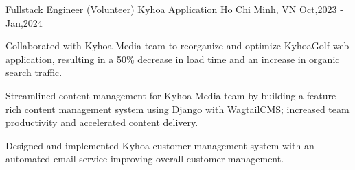 \cventry
{Fullstack Engineer (Volunteer)} %
{Kyhoa Application \href{https://kyhoa-1e92f6cd9b25.herokuapp.com/}{\faExternalLink*}} %
{Ho Chi Minh, VN} 
{Oct,2023 - Jan,2024} %
{
  \begin{cvitems}
    \item {Collaborated with Kyhoa Media team to reorganize and optimize KyhoaGolf web application, resulting in a 50\% decrease in load time and an increase in organic search traffic.}
    \item {Streamlined content management for Kyhoa Media team by building a feature-rich content management system using Django with WagtailCMS; increased team productivity and accelerated content delivery.}
    \item {Designed and implemented Kyhoa customer management system with an automated email service improving overall customer management.}
  \end{cvitems}
}
